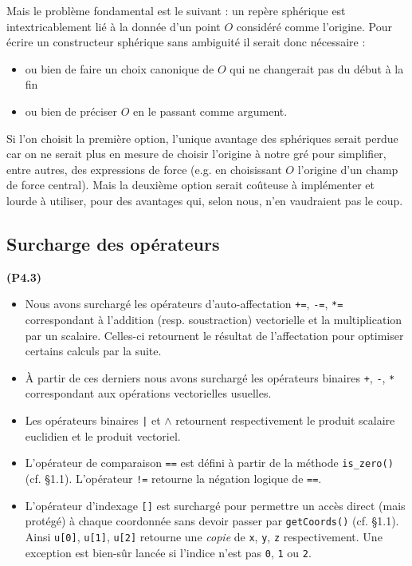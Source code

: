 \documentclass[12pt, letterpaper, twoside]{article}
\newcommand{\T}[1]{\texttt{#1}}
\begin{document}
Mais le problème fondamental est le suivant : un repère sphérique est intextricablement lié à la donnée d'un point $O$ considéré comme l'origine. Pour écrire un constructeur sphérique sans ambiguité il serait donc nécessaire :
\begin{itemize}
\item ou bien de faire un choix canonique de $O$ qui ne changerait pas du début à la fin
\item ou bien de préciser $O$ en le passant comme argument.
\end{itemize}
Si l'on choisit la première option, l'unique avantage des sphériques serait perdue car on ne serait plus en mesure de choisir l'origine à notre gré pour simplifier, entre autres, des expressions de force (e.g. en choisissant $O$ l'origine d'un champ de force central). Mais la deuxième option serait coûteuse à implémenter et lourde à utiliser, pour des avantages qui, selon nous, n'en vaudraient pas le coup.

\subsection{Surcharge des opérateurs}
\noindent \textbf{(P4.3)}
\begin{itemize}
\item Nous avons surchargé les opérateurs d'auto-affectation \T{+=}, \T{-=}, \T{*=} correspondant à l'addition (resp. soustraction) vectorielle et la multiplication par un scalaire. Celles-ci retournent le résultat de l'affectation pour optimiser certains calculs par la suite.

\item À partir de ces derniers nous avons surchargé les opérateurs binaires \T{+}, \T{-}, \T{*} correspondant aux opérations vectorielles usuelles.

\item Les opérateurs binaires \T{|} et \T{$\wedge$} retournent respectivement le produit scalaire euclidien et le produit vectoriel.

\item L'opérateur de comparaison \T{==} est défini à partir de la méthode \T{is\_zero()} (cf. \S1.1). L'opérateur \T{!=} retourne la négation logique de \T{==}.

\item L'opérateur d'indexage \T{[]} est surchargé pour permettre un accès direct (mais protégé) à chaque coordonnée sans devoir passer par \T{getCoords()} (cf. \S1.1). Ainsi \T{u[0]}, \T{u[1]}, \T{u[2]} retourne une \textit{copie} de \T{x}, \T{y}, \T{z} respectivement. Une exception est bien-sûr lancée si l'indice n'est pas \T{0}, \T{1} ou \T{2}.
\end{itemize}
\end{document}
